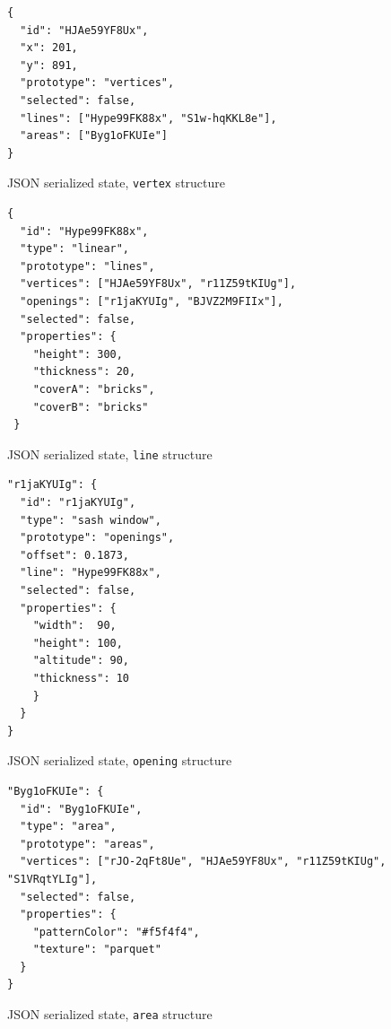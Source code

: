 \begin{listing}
\begin{verbatim}
{
  "id": "HJAe59YF8Ux",
  "x": 201,
  "y": 891,
  "prototype": "vertices",
  "selected": false,
  "lines": ["Hype99FK88x", "S1w-hqKKL8e"],
  "areas": ["Byg1oFKUIe"]
}
\end{verbatim}
\caption{JSON serialized state, {\tt vertex} structure} 
\label{lst:vertex}
\end{listing}

\begin{listing}
\begin{verbatim}
{
  "id": "Hype99FK88x",
  "type": "linear",
  "prototype": "lines",
  "vertices": ["HJAe59YF8Ux", "r11Z59tKIUg"],
  "openings": ["r1jaKYUIg", "BJVZ2M9FIIx"],
  "selected": false,
  "properties": {
    "height": 300,
    "thickness": 20,
    "coverA": "bricks",
    "coverB": "bricks"
 }
\end{verbatim}
\caption{JSON serialized state, {\tt line} structure} 
\label{lst:line}
\end{listing}

\iffalse

\begin{listing}
\begin{verbatim}
"r1jaKYUIg": {
  "id": "r1jaKYUIg",
  "type": "sash window",
  "prototype": "openings",
  "offset": 0.1873,
  "line": "Hype99FK88x",
  "selected": false,
  "properties": {
    "width":  90,
    "height": 100,
    "altitude": 90,
    "thickness": 10
    }
  }
}
\end{verbatim}
\caption{JSON serialized state, {\tt opening} structure} 
\label{lst:opening}
\end{listing}



\begin{listing}
\begin{verbatim}
"Byg1oFKUIe": {
  "id": "Byg1oFKUIe",
  "type": "area",
  "prototype": "areas",
  "vertices": ["rJO-2qFt8Ue", "HJAe59YF8Ux", "r11Z59tKIUg", "S1VRqtYLIg"],
  "selected": false,
  "properties": {
    "patternColor": "#f5f4f4",
    "texture": "parquet"
  }
}
\end{verbatim}
\caption{JSON serialized state, {\tt area} structure} 
\label{area}
\end{listing}




